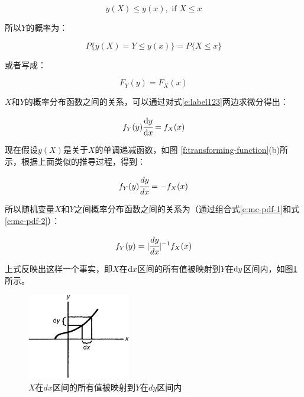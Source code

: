 \begin{equation}
	y(X)\leq y(x), \text{ if } X\leq x
\end{equation}

\noindent 所以$Y$的概率为：

\begin{equation}
	P\{y(X)=Y\leq y(x)\}=P\{X\leq x\}
\end{equation}

\noindent 或者写成：

\begin{equation}\label{e:label123}
	F_Y(y)=F_X(x)
\end{equation}

\noindent $X$和$Y$的概率分布函数之间的关系，可以通过对式\ref{e:label123}两边求微分得出：

\begin{equation}\label{e:mc-pdf-1}
	f_Y(y) \cfrac{{\rm d}y}{{\rm d}x}=f_X(x)
\end{equation}

现在假设$y(X)$是关于$X$的单调递减函数，如图 \ref{f:transforming-function}(b)所示，根据上面类似的推导过程，得到：

\begin{equation}\label{e:mc-pdf-2}
	f_Y(y) \cfrac{dy}{dx}=-f_X(x)
\end{equation} 

所以随机变量$X$和$Y$之间概率分布函数之间的关系为（通过组合式\ref{e:mc-pdf-1}和式\ref{e:mc-pdf-2}）：

\begin{equation}
	f_Y(y)=| \cfrac{dy}{dx}|^{-1}f_X(x)
\end{equation}

上式反映出这样一个事实，即$X$在${\rm d}x$区间的所有值被映射到$Y$在${\rm d}y$区间内，如图\ref{f:pdf-map}所示。

\begin{figure}
\sidecaption
	\includegraphics[width=0.4\textwidth]{graphics/gi/mc-10}
	\caption{$X$在$dx$区间的所有值被映射到$Y$在$dy$区间内}
	\label{f:pdf-map}
\end{figure}





